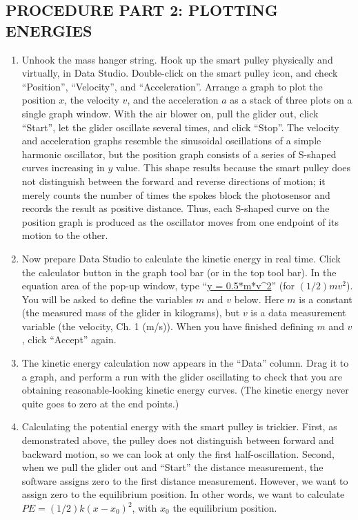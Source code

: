 \subsection*{PROCEDURE PART 2: PLOTTING ENERGIES}

\begin{enumerate}[label=\arabic*.]

\item Unhook the mass hanger string. Hook up the smart pulley physically and virtually, in Data Studio.  Double-click on the smart pulley icon, and check ``Position'', ``Velocity'', and ``Acceleration''.  Arrange a graph to plot the position \(x\), the velocity \(v\), and the acceleration \(a\) as a stack of three plots on a single graph window.  With the air blower on, pull the glider out, click ``Start'', let the glider oscillate several times, and click ``Stop''.  The velocity and acceleration graphs resemble the sinusoidal oscillations of a simple harmonic oscillator, but the position graph consists of a series of S-shaped curves increasing in \(y\) value.  This shape results because the smart pulley does not distinguish between the forward and reverse directions of motion; it merely counts the number of times the spokes block the photosensor and records the result as positive distance.  Thus, each S-shaped curve on the position graph is produced as the oscillator moves from one endpoint of its motion to the other.

\item Now prepare Data Studio to calculate the kinetic energy in real time.  Click the calculator button in the graph tool bar (or in the top tool bar).  In the equation area of the pop-up window, type ``\url{y = 0.5*m*v^2}'' (for \((1/2)mv^2\)).  You will be asked to define the variables \(m\) and \(v\) below.  Here \(m\) is a constant (the measured mass of the glider in kilograms), but \(v\) is a data measurement variable (the velocity, Ch. 1 (m/s)).  When you have finished defining \(m\) and \(v\), click ``Accept'' again.

\item The kinetic energy calculation now appears in the ``Data'' column.  Drag it to a graph, and perform a run with the glider oscillating to check that you are obtaining reasonable-looking kinetic energy curves.  (The kinetic energy never quite goes to zero at the end points.)

\item Calculating the potential energy with the smart pulley is trickier.  First, as demonstrated above, the pulley does not distinguish between forward and backward motion, so we can look at only the first half-oscillation.  Second, when we pull the glider out and ``Start'' the distance measurement, the software assigns zero to the first distance measurement.  However, we want to assign zero to the equilibrium position.  In other words, we want to calculate \(PE = (1/2)k(x-x_0)^2\), with \(x_0\) the equilibrium position.


\end{enumerate}
